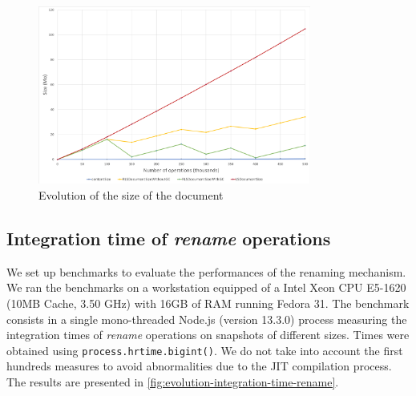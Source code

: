 \documentclass{article}
\theoremstyle{definition}
\begin{document}
\begin{figure}
    \centering
    \includegraphics[width=0.8\textwidth]{img/evolution-document-size.png}
    \caption{Evolution of the size of the document}
    \label{fig:evolution-document-size}
\end{figure}


\subsection{Integration time of \emph{rename} operations}
\label{sec:integration-time-rename}

We set up benchmarks to evaluate the performances of the renaming mechanism.
We ran the benchmarks on a workstation equipped of a Intel Xeon CPU E5-1620 (10MB Cache, 3.50 GHz) with 16GB of RAM running Fedora 31.
The benchmark consists in a single mono-threaded Node.js (version 13.3.0) process measuring the integration times of \emph{rename} operations on snapshots of different sizes.
Times were obtained using \verb|process.hrtime.bigint()|.
We do not take into account the first hundreds measures to avoid abnormalities due to the \ac{JIT} compilation process.
The results are presented in \autoref{fig:evolution-integration-time-rename}.
\end{document}
